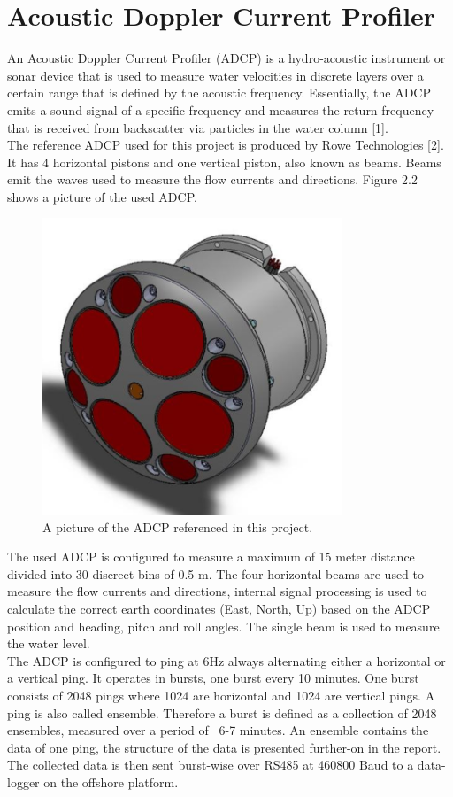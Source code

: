 \section{Acoustic Doppler Current Profiler}
An Acoustic Doppler Current Profiler (ADCP) is a hydro-acoustic instrument or sonar device that is used to measure water velocities in discrete layers over a certain range that is defined by the acoustic frequency. Essentially, the ADCP emits a sound signal of a specific frequency and measures the return frequency that is received from backscatter via particles in the water column [1].\\
The reference ADCP used for this project is produced by Rowe Technologies [2]. It has 4 horizontal pistons and one vertical piston, also known as beams. Beams emit the waves used to measure the flow currents and directions. Figure 2.2 shows a picture of the used ADCP.\\
\begin{figure}[h]
\centering
      \includegraphics[width=0.8\textwidth]{adcp}
        \caption{A picture of the ADCP referenced in this project. }
\end{figure}
The used ADCP is configured to measure a maximum of 15 meter distance divided into 30 discreet bins of 0.5 m. The four horizontal beams are used to measure the flow currents and directions, internal signal processing is used to calculate the correct earth coordinates (East, North, Up) based on the ADCP position and heading, pitch and roll angles. The single beam is used to measure the water level.\\
The ADCP is configured to ping at 6Hz always alternating either a horizontal or a vertical ping. It operates in bursts, one burst every 10 minutes. One burst consists of 2048 pings where 1024 are horizontal and 1024 are vertical pings. A ping is also called ensemble. Therefore a burst is defined as a collection of 2048 ensembles, measured over a period of ~6-7 minutes. An ensemble contains the data of one ping, the structure of the data is presented further-on in the report. The collected data is then sent burst-wise over RS485 at 460800 Baud to a data-logger on the offshore platform.

